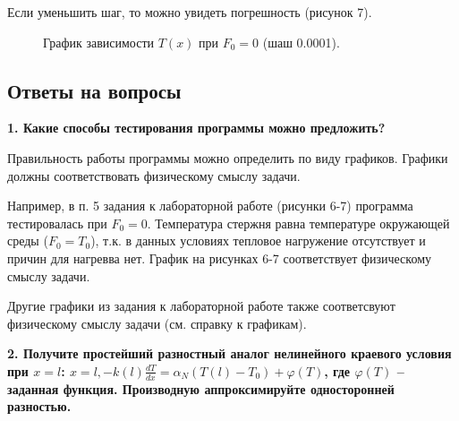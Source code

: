 \documentclass[a4paper,14pt]{article}
\begin{document}
Если уменьшить шаг, то можно увидеть погрешность (рисунок 7).

\begin{figure}[!h]
	\caption{График зависимости $T(x)$ при $F_0 = 0$ (шаш 0.0001).}
	\label{fig:image}
\end{figure}

\newpage
\subsection*{Ответы на вопросы}

\textbf{1. Какие способы тестирования программы можно предложить?}

Правильность работы программы можно определить по виду графиков.
Графики должны соответствовать физическому смыслу задачи.

Например, в п. 5 задания к лабораторной работе (рисунки 6-7) программа
тестировалась при $F_0 = 0$. Температура стержня равна температуре
окружающей среды ($F_0 = T_0$), т.к. в данных условиях тепловое нагружение
отсутствует и причин для нагревва нет. График на рисунках 6-7 соответствует 
физическому смыслу задачи.

Другие графики из задания к лабораторной работе также соответсвуют
физическому смыслу задачи (см. справку к графикам).

\textbf{2. Получите  простейший разностный аналог нелинейного краевого условия при $x = l$:
$x = l, -k(l)\frac{dT}{dx} = \alpha_N(T(l) - T_0) + \varphi (T)$, где 
$\varphi(T)$ -- заданная функция. Производную аппроксимируйте односторонней разностью.}
\end{document}

